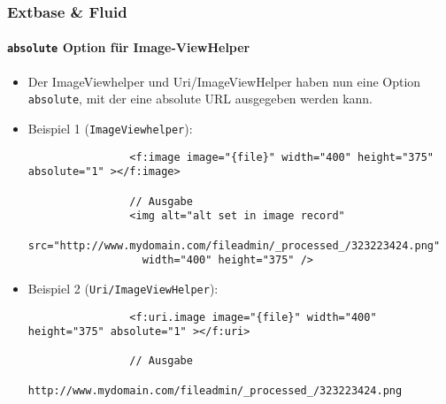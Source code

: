 
\begin{frame}[fragile]
	\frametitle{Extbase \& Fluid}
	\framesubtitle{\texttt{absolute} Option für Image-ViewHelper}

	\lstset{basicstyle=\tiny\ttfamily}

	\begin{itemize}

		\item Der ImageViewhelper und Uri/ImageViewHelper haben nun eine Option \texttt{absolute},
			mit der eine absolute URL ausgegeben werden kann.

		\item Beispiel 1 (\texttt{ImageViewhelper}):

			\begin{lstlisting}
				<f:image image="{file}" width="400" height="375" absolute="1" ></f:image>

				// Ausgabe
				<img alt="alt set in image record"
				  src="http://www.mydomain.com/fileadmin/_processed_/323223424.png"
				  width="400" height="375" />
			\end{lstlisting}

		\item Beispiel 2 (\texttt{Uri/ImageViewHelper}):

			\begin{lstlisting}
				<f:uri.image image="{file}" width="400" height="375" absolute="1" ></f:uri>

				// Ausgabe
				http://www.mydomain.com/fileadmin/_processed_/323223424.png
			\end{lstlisting}

	\end{itemize}

\end{frame}


